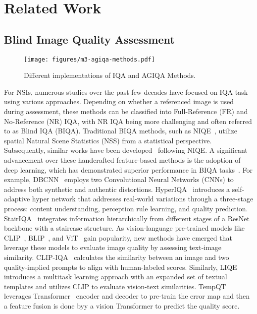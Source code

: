 \section{Related Work}
\label{sec:related}
\subsection{Blind Image Quality Assessment}
\begin{figure}
    \centering
    \texttt{[image: figures/m3-agiqa-methods.pdf]}
    \caption{Different implementations of IQA and AGIQA Methods.}
    \label{fig:related_work}
\end{figure}
For NSIs, numerous studies over the past few decades have focused on IQA task using various approaches. 
Depending on whether a referenced image is used during assessment, these methods can be classified into Full-Reference (FR) and No-Reference (NR) IQA, with NR IQA being more challenging and often referred to as Blind IQA (BIQA).
Traditional BIQA methods, such as NIQE~\cite{mittal2012making}, utilize spatial Natural Scene Statistics (NSS) from a statistical perspective. 
Subsequently, similar works have been developed~\cite{xue2014blind,zhang2014blind,zhang2015feature,xu2016blind} following NIQE.
A significant advancement over these handcrafted feature-based methods is the adoption of deep learning, which has demonstrated superior performance in BIQA tasks~\cite{hou2014blind,kang2014convolutional,zhang2018blind,yang2020ttl,yang2020blind,sun2022blind,zhu2022blind,sun2022graphiqa}.
For example, DBCNN~\cite{zhang2018blind} employs two Convolutional Neural Networks (CNNs) to address both synthetic and authentic distortions. 
HyperIQA~\cite{Su_2020_CVPR} introduces a self-adaptive hyper network that addresses real-world variations through a three-stage process: content understanding, perception rule learning, and quality prediction.
StairIQA~\cite{sun2022blind} integrates information hierarchically from different stages of a ResNet~\cite{he2016deep} backbone with a staircase structure.
As vision-language pre-trained models like CLIP~\cite{radford2021learning}, BLIP~\cite{li2022blip}, and ViT~\cite{dosovitskiy2020image} gain popularity, new methods have emerged that leverage these models to evaluate image quality by assessing text-image similarity.
CLIP-IQA~\cite{wang2023exploring} calculates the similarity between an image and two quality-implied prompts to align with human-labeled scores.
Similarly, LIQE~\cite{zhang2023blind} introduces a multitask learning approach with an expanded set of textual templates and utilizes CLIP to evaluate vision-text similarities. TempQT~\cite{shi2023blind} leverages Transformer~\cite{vaswani2017attention} encoder and decoder to pre-train the error map and then a feature fusion is done byy a vision Transformer to predict the quality score.

